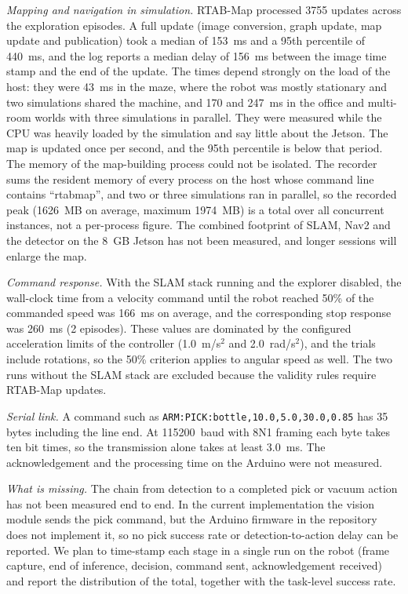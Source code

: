 \noindent\textit{Mapping and navigation in simulation.} RTAB-Map processed 3755 updates across the exploration episodes. A full update (image conversion, graph update, map update and publication) took a median of 153~ms and a 95th percentile of 440~ms, and the log reports a median delay of 156~ms between the image time stamp and the end of the update. The times depend strongly on the load of the host: they were 43~ms in the maze, where the robot was mostly stationary and two simulations shared the machine, and 170 and 247~ms in the office and multi-room worlds with three simulations in parallel. They were measured while the CPU was heavily loaded by the simulation and say little about the Jetson. The map is updated once per second, and the 95th percentile is below that period. The memory of the map-building process could not be isolated. The recorder sums the resident memory of every process on the host whose command line contains ``rtabmap'', and two or three simulations ran in parallel, so the recorded peak (1626~MB on average, maximum 1974~MB) is a total over all concurrent instances, not a per-process figure. The combined footprint of SLAM, Nav2 and the detector on the 8~GB Jetson has not been measured, and longer sessions will enlarge the map.

\noindent\textit{Command response.} With the SLAM stack running and the explorer disabled, the wall-clock time from a velocity command until the robot reached 50\% of the commanded speed was 166~ms on average, and the corresponding stop response was 260~ms (2 episodes). These values are dominated by the configured acceleration limits of the controller (1.0~m/s$^2$ and 2.0~rad/s$^2$), and the trials include rotations, so the 50\% criterion applies to angular speed as well. The two runs without the SLAM stack are excluded because the validity rules require RTAB-Map updates.

\noindent\textit{Serial link.} A command such as \texttt{ARM:PICK:bottle,10.0,5.0,30.0,0.85} has 35 bytes including the line end. At 115200~baud with 8N1 framing each byte takes ten bit times, so the transmission alone takes at least 3.0~ms. The acknowledgement and the processing time on the Arduino were not measured.

\noindent\textit{What is missing.} The chain from detection to a completed pick or vacuum action has not been measured end to end. In the current implementation the vision module sends the pick command, but the Arduino firmware in the repository does not implement it, so no pick success rate or detection-to-action delay can be reported. We plan to time-stamp each stage in a single run on the robot (frame capture, end of inference, decision, command sent, acknowledgement received) and report the distribution of the total, together with the task-level success rate.
